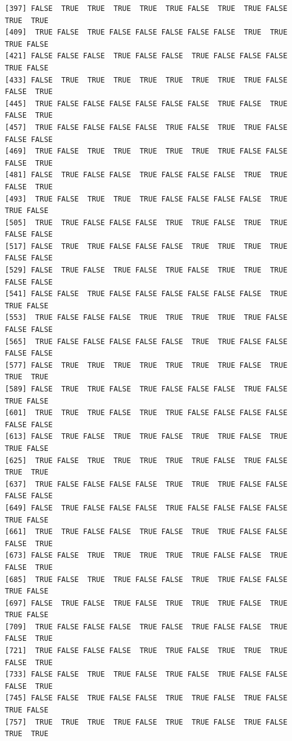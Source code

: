 \documentclass[
  letterpaper,
  DIV=11,
  numbers=noendperiod]{scrreprt}
\newenvironment{Shaded}{\begin{snugshade}}{\end{snugshade}}
\newcommand{\CommentTok}[1]{\textcolor[rgb]{0.37,0.37,0.37}{#1}}
\newcommand{\FunctionTok}[1]{\textcolor[rgb]{0.28,0.35,0.67}{#1}}
\newcommand{\NormalTok}[1]{\textcolor[rgb]{0.00,0.23,0.31}{#1}}
\newcommand{\SpecialCharTok}[1]{\textcolor[rgb]{0.37,0.37,0.37}{#1}}
\begin{document}
\begin{verbatim}
[397] FALSE  TRUE  TRUE  TRUE  TRUE  TRUE FALSE  TRUE  TRUE FALSE  TRUE  TRUE
[409]  TRUE FALSE  TRUE FALSE FALSE FALSE FALSE FALSE  TRUE  TRUE  TRUE FALSE
[421] FALSE FALSE FALSE  TRUE FALSE FALSE  TRUE FALSE FALSE FALSE  TRUE FALSE
[433] FALSE  TRUE  TRUE  TRUE  TRUE  TRUE  TRUE  TRUE  TRUE FALSE FALSE  TRUE
[445]  TRUE FALSE FALSE FALSE FALSE FALSE FALSE  TRUE FALSE  TRUE FALSE  TRUE
[457]  TRUE FALSE FALSE FALSE FALSE  TRUE FALSE  TRUE  TRUE FALSE FALSE FALSE
[469]  TRUE FALSE  TRUE  TRUE  TRUE  TRUE  TRUE  TRUE FALSE FALSE FALSE  TRUE
[481] FALSE  TRUE FALSE FALSE  TRUE FALSE FALSE FALSE  TRUE  TRUE FALSE  TRUE
[493]  TRUE FALSE  TRUE  TRUE  TRUE FALSE FALSE FALSE FALSE  TRUE  TRUE FALSE
[505]  TRUE  TRUE FALSE FALSE FALSE  TRUE  TRUE FALSE  TRUE  TRUE FALSE FALSE
[517] FALSE  TRUE  TRUE FALSE FALSE FALSE  TRUE  TRUE  TRUE  TRUE FALSE FALSE
[529] FALSE  TRUE FALSE  TRUE FALSE  TRUE FALSE  TRUE  TRUE  TRUE FALSE FALSE
[541] FALSE FALSE  TRUE FALSE FALSE FALSE FALSE FALSE FALSE  TRUE  TRUE FALSE
[553]  TRUE FALSE FALSE FALSE  TRUE  TRUE  TRUE  TRUE  TRUE FALSE FALSE FALSE
[565]  TRUE FALSE FALSE FALSE FALSE FALSE  TRUE  TRUE FALSE FALSE FALSE FALSE
[577] FALSE  TRUE  TRUE  TRUE  TRUE  TRUE  TRUE  TRUE FALSE  TRUE  TRUE  TRUE
[589] FALSE  TRUE  TRUE FALSE  TRUE FALSE FALSE FALSE  TRUE FALSE  TRUE FALSE
[601]  TRUE  TRUE  TRUE FALSE  TRUE  TRUE FALSE FALSE FALSE FALSE FALSE FALSE
[613] FALSE  TRUE FALSE  TRUE  TRUE FALSE  TRUE  TRUE FALSE  TRUE  TRUE FALSE
[625]  TRUE FALSE  TRUE  TRUE  TRUE  TRUE  TRUE FALSE  TRUE FALSE  TRUE  TRUE
[637]  TRUE FALSE FALSE FALSE FALSE  TRUE  TRUE  TRUE FALSE FALSE FALSE FALSE
[649] FALSE  TRUE FALSE FALSE FALSE  TRUE FALSE FALSE FALSE FALSE  TRUE FALSE
[661]  TRUE  TRUE FALSE FALSE  TRUE FALSE  TRUE  TRUE FALSE FALSE FALSE  TRUE
[673] FALSE FALSE  TRUE  TRUE  TRUE  TRUE  TRUE FALSE FALSE  TRUE FALSE  TRUE
[685]  TRUE FALSE  TRUE  TRUE FALSE FALSE  TRUE  TRUE FALSE FALSE  TRUE FALSE
[697] FALSE  TRUE FALSE  TRUE FALSE  TRUE  TRUE  TRUE FALSE  TRUE  TRUE FALSE
[709]  TRUE FALSE FALSE FALSE  TRUE FALSE  TRUE FALSE FALSE  TRUE FALSE  TRUE
[721]  TRUE FALSE FALSE FALSE  TRUE  TRUE FALSE  TRUE  TRUE  TRUE FALSE  TRUE
[733] FALSE FALSE  TRUE  TRUE FALSE  TRUE FALSE  TRUE FALSE FALSE FALSE  TRUE
[745] FALSE FALSE  TRUE FALSE FALSE  TRUE  TRUE FALSE  TRUE FALSE  TRUE FALSE
[757]  TRUE  TRUE  TRUE  TRUE FALSE  TRUE  TRUE FALSE  TRUE FALSE  TRUE  TRUE
\end{verbatim}

\begin{Shaded}
\end{Shaded}
\end{document}

